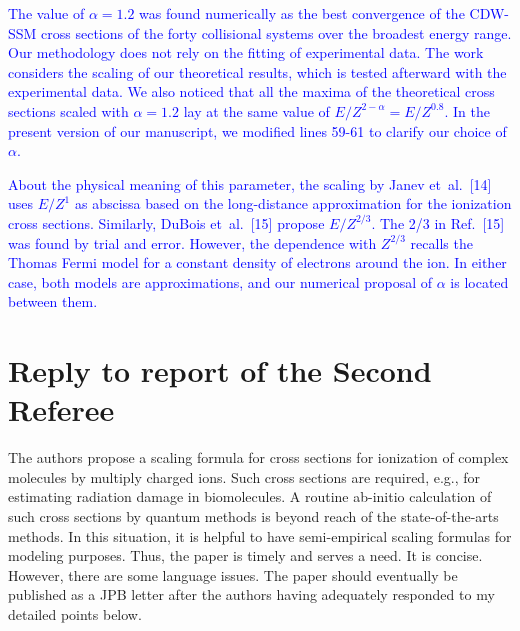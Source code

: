 \documentclass[a4paper,12pt]{article}
\def\reply#1{\vspace{0.1cm}\textcolor{blue}{#1}}
\begin{document}
\vspace{0.2cm}

\reply{The value of $\alpha=1.2$ was found numerically as the best
convergence of the CDW-SSM cross sections of the forty collisional 
systems over the broadest energy range. Our methodology does not rely 
on the fitting of experimental data. The work considers the scaling of 
our theoretical results, which is tested afterward with the 
experimental data. We also noticed that all the maxima of the 
theoretical cross sections scaled with $\alpha=1.2$ lay at the same 
value of $E/Z^{2-\alpha}=E/Z^{0.8}$. In the present version of our 
manuscript, we modified lines 59-61 to clarify our choice of $\alpha$.}

\reply{About the  physical meaning of this parameter, the scaling by
Janev et~al.~[14] uses $E/Z^1$ as abscissa based on the long-distance
approximation for the ionization cross sections. Similarly, DuBois 
et~al.~[15] propose $E/Z^{2/3}$. The 2/3 in Ref.~[15] was found by 
trial and error. However, the dependence with $Z^{2/3}$ recalls the 
Thomas Fermi model for a constant density of electrons around the ion. 
In either case, both models are approximations, and our numerical 
proposal of $\alpha$ is located between them.} 

\vspace{0.2 cm}
\section{Reply to report of the Second Referee}

The authors propose a scaling formula for cross sections for ionization
of complex molecules by multiply charged ions. Such cross sections are
required, e.g., for estimating radiation damage in biomolecules. A
routine ab-initio calculation of such cross sections by quantum methods
is beyond reach of the state-of-the-arts methods. In this situation, 
it is helpful to have semi-empirical scaling formulas for modeling
purposes. Thus, the paper is timely and serves a need. It is concise.
However, there are some language issues. The paper should eventually be
published as a JPB letter after the authors having adequately responded
to my detailed points below. 

\end{document}
